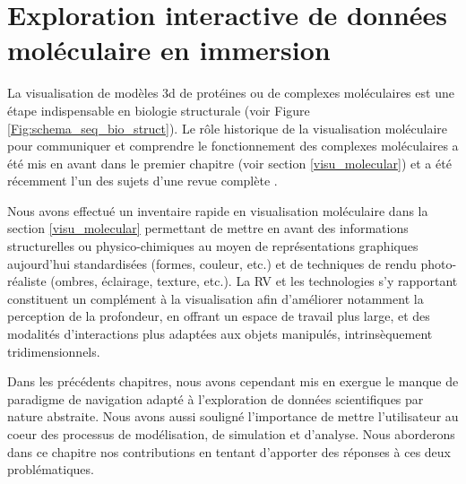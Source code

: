 
\chapter[Exploration interactive de données moléculaire en immersion]{Exploration interactive de données moléculaire en immersion}
\label{Sec:CantorDigitalis}
\minitoc
\cleardoublepage

La visualisation de modèles 3d de protéines ou de complexes moléculaires est une étape indispensable en biologie structurale (voir Figure \ref{Fig:schema_seq_bio_struct}). Le rôle historique de la visualisation moléculaire pour communiquer et comprendre le fonctionnement des complexes moléculaires a été mis en avant dans le premier chapitre (voir section \ref{visu_molecular}) et a été récemment l'un des sujets d'une revue complète \cite{kehrer_visualization_2013}.

Nous avons effectué un inventaire rapide en visualisation moléculaire dans la section \ref{visu_molecular} permettant de mettre en avant des informations structurelles ou physico-chimiques au moyen de représentations graphiques aujourd'hui standardisées (formes, couleur, etc.) et de techniques de rendu photo-réaliste (ombres, éclairage, texture, etc.). La RV et les technologies s'y rapportant constituent un complément à la visualisation afin d'améliorer notamment la perception de la profondeur, en offrant un espace de travail plus large, et des modalités d'interactions plus adaptées aux objets manipulés, intrinsèquement tridimensionnels.


Dans les précédents chapitres, nous avons cependant mis en exergue le manque de paradigme de navigation adapté à l'exploration de données scientifiques par nature abstraite. Nous avons aussi souligné l'importance de mettre l'utilisateur au coeur des processus de modélisation, de simulation et d'analyse. Nous aborderons dans ce chapitre nos contributions en tentant d'apporter des réponses à ces deux problématiques.


